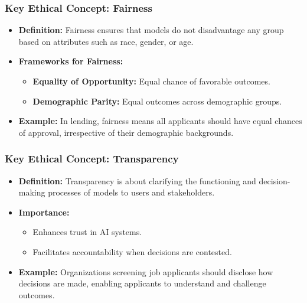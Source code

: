 \documentclass[aspectratio=169]{beamer}
\begin{document}
\begin{frame}[fragile]
    \frametitle{Key Ethical Concept: Fairness}
    
    \begin{itemize}
        \item \textbf{Definition:} Fairness ensures that models do not disadvantage any group based on attributes such as race, gender, or age.
        \item \textbf{Frameworks for Fairness:}
        \begin{itemize}
            \item \textbf{Equality of Opportunity:} Equal chance of favorable outcomes.
            \item \textbf{Demographic Parity:} Equal outcomes across demographic groups.
        \end{itemize}
        \item \textbf{Example:} In lending, fairness means all applicants should have equal chances of approval, irrespective of their demographic backgrounds.
    \end{itemize}
\end{frame}

\begin{frame}[fragile]
    \frametitle{Key Ethical Concept: Transparency}
    
    \begin{itemize}
        \item \textbf{Definition:} Transparency is about clarifying the functioning and decision-making processes of models to users and stakeholders.
        \item \textbf{Importance:}
        \begin{itemize}
            \item Enhances trust in AI systems.
            \item Facilitates accountability when decisions are contested.
        \end{itemize}
        \item \textbf{Example:} Organizations screening job applicants should disclose how decisions are made, enabling applicants to understand and challenge outcomes.
    \end{itemize}
\end{frame}
\end{document}

